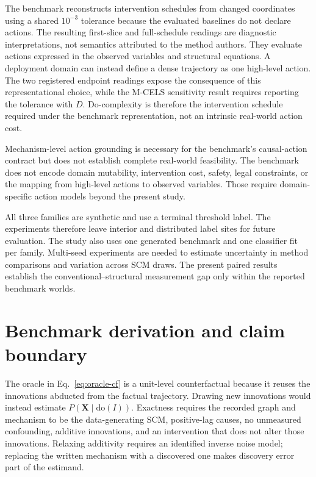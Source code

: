 \documentclass{article}
\newcommand{\dop}{\mathrm{do}}
\begin{document}
The benchmark reconstructs intervention schedules from changed coordinates using a shared $10^{-3}$ tolerance because the evaluated baselines do not declare actions. The resulting first-slice and full-schedule readings are diagnostic interpretations, not semantics attributed to the method authors. They evaluate actions expressed in the observed variables and structural equations. A deployment domain can instead define a dense trajectory as one high-level action. The two registered endpoint readings expose the consequence of this representational choice, while the M-CELS sensitivity result requires reporting the tolerance with $D$. Do-complexity is therefore the intervention schedule required under the benchmark representation, not an intrinsic real-world action cost.

Mechanism-level action grounding is necessary for the benchmark's causal-action contract but does not establish complete real-world feasibility. The benchmark does not encode domain mutability, intervention cost, safety, legal constraints, or the mapping from high-level actions to observed variables. Those require domain-specific action models beyond the present study.

All three families are synthetic and use a terminal threshold label. The experiments therefore leave interior and distributed label sites for future evaluation. The study also uses one generated benchmark and one classifier fit per family. Multi-seed experiments are needed to estimate uncertainty in method comparisons and variation across SCM draws. The present paired results establish the conventional--structural measurement gap only within the reported benchmark worlds.

\section{Benchmark derivation and claim boundary}
\label{app:benchmark-details}

The oracle in Eq.~\eqref{eq:oracle-cf} is a unit-level counterfactual because it reuses the innovations abducted from the factual trajectory.  Drawing new innovations would instead estimate $P(\mathbf{X}\mid\dop(I))$.  Exactness requires the recorded graph and mechanism to be the data-generating SCM, positive-lag causes, no unmeasured confounding, additive innovations, and an intervention that does not alter those innovations.  Relaxing additivity requires an identified inverse noise model; replacing the written mechanism with a discovered one makes discovery error part of the estimand.
\end{document}

